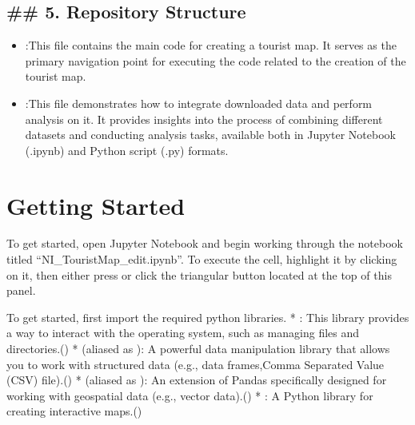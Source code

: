 \documentclass[letterpaper,10pt,english]{sphinxmanual}
\begin{document}
\subsection{\#\# 5. Repository Structure}
\label{\detokenize{egm722_serenee/NI_Tourist_Map_doc:repository-structure}}\begin{itemize}
\item {} 
\sphinxAtStartPar
{} :This file contains the main code for creating a tourist map. It serves as the primary navigation point for executing the code related to the creation of the tourist map.

\item {} 
\sphinxAtStartPar
{} :This file demonstrates how to integrate downloaded data and perform analysis on it. It provides insights into the process of combining different datasets and conducting analysis tasks, available both in Jupyter Notebook (.ipynb) and Python script (.py) formats.

\end{itemize}


\section{Getting Started}
\label{\detokenize{egm722_serenee/NI_Tourist_Map_doc:id5}}
\sphinxAtStartPar
To get started, open Jupyter Notebook and begin working through the notebook titled “NI\_TouristMap\_edit.ipynb”.
To execute the cell, highlight it by clicking on it, then either press  or click the triangular  button located at the top of this panel.

\sphinxAtStartPar
{}

\sphinxAtStartPar
To get started, first import the required python libraries.
* : This library provides a way to interact with the operating system, such as managing files and directories.()
*  (aliased as ): A powerful data manipulation library that allows you to work with structured data (e.g., data frames,Comma Separated Value (CSV) file).()
*  (aliased as ): An extension of Pandas specifically designed for working with geospatial data (e.g., vector data).()
* : A Python library for creating interactive maps.()
\end{document}
